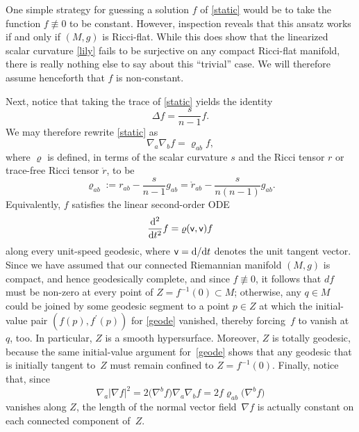\documentclass[10pt,a4paper]{amsart}
\numberwithin{equation}{section}
\begin{document}
One simple strategy for guessing a solution $f$ of \eqref{static} would be to take the function $f\not\equiv 0$ to be constant.
However, inspection reveals that this ansatz works
 if and only if $(M,g)$ is Ricci-flat. While this does show that the linearized scalar curvature \eqref{lily} fails to be surjective on any compact Ricci-flat manifold,
 there is really nothing else to say about this ``trivial'' case. {We will therefore assume henceforth that $f$ is non-constant}.

Next, notice that taking the trace of \eqref{static} yields the identity
\begin{equation}
\label{basso}
\Delta f = \frac{s}{n-1} f .
\end{equation}
We may therefore rewrite \eqref{static}
as
\begin{equation}
\label{thingone}
\nabla_a \nabla_b f = \varrho_{ab} f,
\end{equation}
where $\varrho$ is defined, in terms of the scalar curvature $s$ and the Ricci tensor $r$ or trace-free Ricci tensor $\mathring{r}$, to be
\begin{equation*}
\varrho_{ab}:= r_{ab} - \frac{s}{n-1} g_{ab}= \mathring{r}_{ab} - \frac{s}{n(n-1)} g_{ab}.
\end{equation*}
Equivalently, $f$ satisfies the linear second-order ODE
\begin{equation}\label{geode}
\frac{{\rm d}^2}{{\rm d}t^2}f = \varrho (\mathsf{v} , \mathsf{v})f
\end{equation}
along every unit-speed geodesic, where $\mathsf{v}={\rm d}/{\rm d}t$ denotes the unit tangent vector.
Since we have assumed that our connected Riemannian manifold $(M,g)$ is compact, and hence
geodesically complete, and since
$f\not\equiv 0$, it follows that $df$ must be non-zero at every point of $Z=f^{-1}(0)\subset M$;
otherwise, any $q\in M$ could be joined by some geodesic segment to a point $p\in Z$
at which the initial-value pair $(f(p), f^\prime (p))$ for \eqref{geode} vanished, thereby forcing~$f$ to vanish at~$q$, too.
In particular, $Z$ is a smooth hypersurface. Moreover, $Z$ is totally geodesic, because the same initial-value argument for~\eqref{geode} shows that any geodesic that is initially tangent to~$Z$
 must remain confined to $Z=f^{-1}(0)$.
Finally, notice that, since
 \begin{equation*}
\nabla_a |\nabla f|^2 = {2}\big(\nabla^b f\big) \nabla_a \nabla_b f= 2f\varrho_{ab}\big(\nabla^b f\big)
\end{equation*}
vanishes along $Z$, the length of the normal vector field~$\nabla f$ is actually constant on each connected component of~$Z$.
\end{document}
